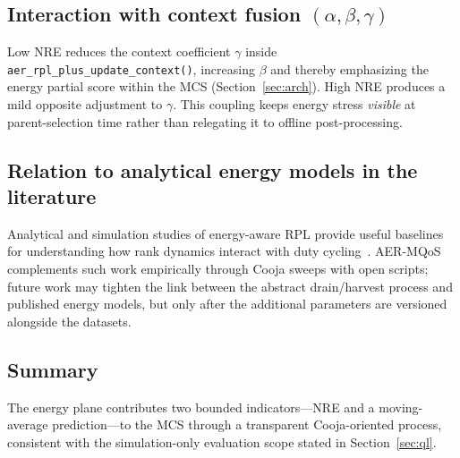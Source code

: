 \subsection{Interaction with context fusion \texorpdfstring{$(\alpha,\beta,\gamma)$}{alpha/beta/gamma}}
Low NRE reduces the context coefficient $\gamma$ inside \texttt{aer\_rpl\_plus\_update\_context()}, increasing $\beta$ and thereby emphasizing the energy partial score within the MCS (Section~\ref{sec:arch}). High NRE produces a mild opposite adjustment to $\gamma$. This coupling keeps energy stress \emph{visible} at parent-selection time rather than relegating it to offline post-processing.

\subsection{Relation to analytical energy models in the literature}
Analytical and simulation studies of energy-aware RPL provide useful baselines for understanding how rank dynamics interact with duty cycling~\cite{limjoco2018analytical}. AER-MQoS complements such work empirically through Cooja sweeps with open scripts; future work may tighten the link between the abstract drain/harvest process and published energy models, but only after the additional parameters are versioned alongside the datasets.

\subsection{Summary}
The energy plane contributes two bounded indicators---NRE and a moving-average prediction---to the MCS through a transparent Cooja-oriented process, consistent with the simulation-only evaluation scope stated in Section~\ref{sec:ql}.
